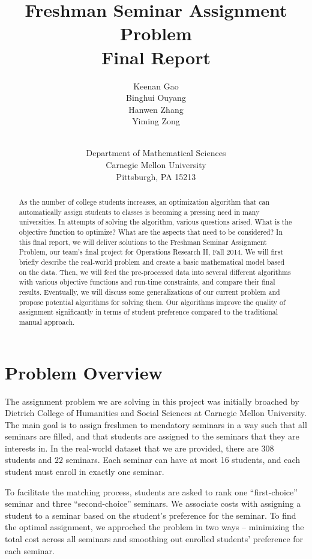 \documentclass{article} %
\title{Freshman Seminar Assignment Problem\\Final Report}
\author{
Keenan Gao \\
\And
Binghui Ouyang \\
\And
Hanwen Zhang \\
\And
Yiming Zong\\ \\
\and Department of Mathematical Sciences \\ Carnegie Mellon University \\ Pittsburgh, PA 15213
}
\begin{document}
\maketitle

\begin{abstract}
    \par\qquad As the number of college students increases, an optimization algorithm that can automatically assign students to classes is becoming a pressing need in many universities. In attempts of solving the algorithm, various questions arised. What is the objective function to optimize? What are the aspects that need to be considered? In this final report, we will deliver solutions to the Freshman Seminar Assignment Problem, our team's final project for Operations Research II, Fall 2014. We will first briefly describe the real-world problem and create a basic mathematical model based on the data. Then, we will feed the pre-processed data into several different algorithms with various objective functions and run-time constraints, and compare their final results. Eventually, we will discuss some generalizations of our current problem and propose potential algorithms for solving them. Our algorithms improve the quality of assignment significantly in terms of student preference compared to the traditional manual approach.
\end{abstract}
\vspace{\fill}
\pagebreak

%
%
\section{Problem Overview}
   \par\qquad The assignment problem we are solving in this project was initially broached by Dietrich College of Humanities and Social Sciences at Carnegie Mellon University. The main goal is to assign freshmen to mendatory seminars in a way such that all seminars are filled, and that students are assigned to the seminars that they are interests in. In the real-world dataset that we are provided, there are $308$ students and $22$ seminars. Each seminar can have at most 16 students, and each student must enroll in exactly one seminar.
   \par\qquad To facilitate the matching process, students are asked to rank one ``first-choice'' seminar and three ``second-choice'' seminars. We associate costs with assigning a student to a seminar based on the student's preference for the seminar. To find the optimal assignment, we approched the problem in two ways -- minimizing the total cost across all seminars and smoothing out enrolled students' preference for each seminar.
\end{document}
